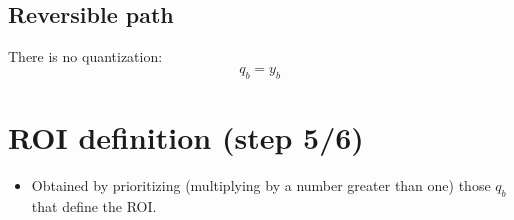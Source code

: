 \subsection*{Reversible path}
There is no quantization:
\begin{equation}
  q_b = y_b
\tag{J2KRanging}
\end{equation}

\section{ROI definition (step 5/6)}
\begin{itemize}
\item Obtained by prioritizing (multiplying by a number greater than
  one) those $q_b$ that define the ROI.
\end{itemize}
\begin{center}
\end{center}

